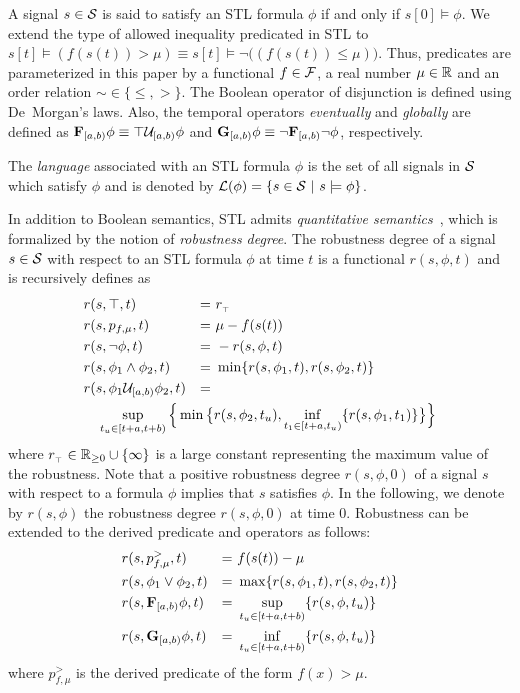 A signal $s\in \mathcal{S}$ is said to satisfy an STL formula $\phi$ if and only if $s[0] \models \phi$. We extend the type of allowed inequality predicated in STL to $s[t] \models (f(s(t)) > \mu) \equiv s[t] \models \neg \big((f(s(t)) \leq \mu) \big)$. Thus, predicates are parameterized in this paper by a functional $f \in \mathcal{F}$, a real number $\mu \in \mathbb{R}$ and an order relation $\sim \in \{\leq, >\}$.
The Boolean operator of disjunction is defined using De~Morgan's laws. Also, the temporal operators {\em eventually} and {\em globally} are defined as $\mathbf{F}_{[a, b)} \phi \equiv \top \mathcal{U}_{[a, b)} \phi$ and $\mathbf{G}_{[a, b)} \phi \equiv \neg \mathbf{F}_{[a, b)} \neg \phi$, respectively.

The {\em language} associated with an STL formula $\phi$ is the set of all signals in $\mathcal{S}$ which satisfy $\phi$ and is denoted by $\mathcal{L}(\phi) = \{s \in \mathcal{S}\ |\ s \models \phi\}$.

In addition to Boolean semantics, STL admits {\em quantitative semantics}~\cite{donze_robust_2010,fainekos_robustness_2009},
which is formalized by the notion of {\em robustness degree}.
The robustness degree of a signal $s\in \mathcal{S}$ with respect to an STL formula $\phi$ at time $t$ is a functional $r(s, \phi, t)$ and is recursively
defines as
\begin{align*}
&r(s, \True, t) &=\ & r_{{}_\True}\\
&r(s, p_{f, \mu}, t) &=\ & \mu - f(s(t))\\
&r(s, \notltl \phi, t) &=\ & -r(s, \phi, t)\\
&r(s, \phi_1 \andltl \phi_2, t) &=\ & \min\{r(s, \phi_1, t), r(s, \phi_2, t)\}\\
&r(s, \phi_1 \Until_{[a, b)} \phi_2, t) &=\ &\\
&\quad \sup_{t_u \in [t+a, t+b)} \Big\{\min\big\{  r(s, \phi_2, t_u),\inf_{t_1\in [t+a, t_u)} \{r(s, \phi_1, t_1)\} \big\}  \Big\} \span \span
\end{align*}
where $r_{{}_\top} \in \mathbb{R}_{\geq 0} \cup \{\infty\}$ is a large constant representing the maximum value of the robustness.
Note that a positive robustness degree $r(s, \phi, 0)$ of a signal $s$ with respect to a formula $\phi$ implies that $s$ satisfies $\phi$. In the following, we denote by $r(s, \phi)$ the robustness degree $r(s, \phi, 0)$
at time $0$.
Robustness can be extended to the derived predicate and operators as follows:
\begin{align*}
&r(s, p_{f, \mu}^>, t) &=\ & f(s(t)) - \mu\\
&r(s, \phi_1 \vee \phi_2, t) &=\ & \max\{r(s, \phi_1, t), r(s, \phi_2, t)\}\\
&r(s, \mathbf{F}_{[a, b)} \phi, t) &=\ & \sup_{t_u \in [t+a, t+b)}\{r(s, \phi, t_u)\}\\
&r(s, \mathbf{G}_{[a, b)} \phi, t) &=\ & \inf_{t_u \in [t+a, t+b)}\{r(s, \phi, t_u)\}\\
\end{align*}
where $p_{f, \mu}^>$ is the derived predicate of the form $f(x) > \mu$.

